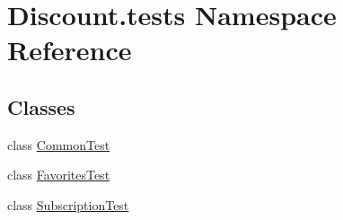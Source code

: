 \hypertarget{namespace_discount_1_1tests}{}\section{Discount.\+tests Namespace Reference}
\label{namespace_discount_1_1tests}
\subsection*{Classes}
\begin{DoxyCompactItemize}
\item 
class \hyperlink{class_discount_1_1tests_1_1_common_test}{Common\+Test}
\item 
class \hyperlink{class_discount_1_1tests_1_1_favorites_test}{Favorites\+Test}
\item 
class \hyperlink{class_discount_1_1tests_1_1_subscription_test}{Subscription\+Test}
\end{DoxyCompactItemize}
